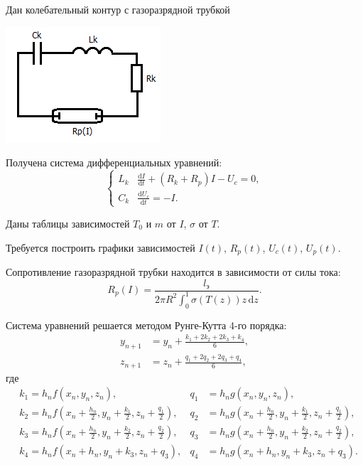 \documentclass[a4paper,oneside,12pt]{extreport}
\begin{document}


Дан колебательный контур с газоразрядной трубкой

\includegraphics{inc/img/scheme}

Получена система дифференциальных уравнений:
\begin{equation*}
	\left\{
	\begin{aligned}
		L_k & \frac{\mathrm dI}{\mathrm dt} + (R_k + R_p) I - U_c = 0, \\
		C_k & \frac{\mathrm dU_c}{\mathrm dt} = -I.
	\end{aligned}
	\right.
\end{equation*}

Даны таблицы зависимостей $T_0$ и $m$ от $I$, $\sigma$ от $T$.

Требуется построить графики зависимостей $I(t)$, $R_p(t)$, $U_c(t)$, $U_p(t)$.

Сопротивление газоразрядной трубки находится в зависимости от силы тока:
\begin{equation*}
	R_p(I) = \frac{l_\text{э}}{2 \pi R^2 \int_0^1 \sigma(T(z))z\,\mathrm dz}.
\end{equation*}

Система уравнений решается методом Рунге-Кутта 4-го порядка:
\begin{equation*}
	\begin{aligned}
		y_{n+1} &= y_n + \frac{k_1 + 2k_2 + 2k_3 + k_4}{6},\\
		z_{n+1} &= z_n + \frac{q_1 + 2q_2 + 2q_3 + q_4}{6},
	\end{aligned}
\end{equation*}
где
\begin{equation*}
	\begin{aligned}
		&k_1  = h_n f(x_n, y_n, z_n),
		&q_1 &= h_n g(x_n, y_n, z_n), \\
		&k_2  = h_n f(x_n + \frac{h_n}{2}, y_n + \frac{k_1}{2}, z_n + \frac{q_1}{2}),
		&q_2 &= h_n g(x_n + \frac{h_n}{2}, y_n + \frac{k_1}{2}, z_n + \frac{q_1}{2}), \\
		&k_3  = h_n f(x_n + \frac{h_n}{2}, y_n + \frac{k_2}{2}, z_n + \frac{q_2}{2}),
		&q_3 &= h_n g(x_n + \frac{h_n}{2}, y_n + \frac{k_2}{2}, z_n + \frac{q_2}{2}), \\
		&k_4  = h_n f(x_n + h_n, y_n + k_3, z_n + q_3),
		&q_4 &= h_n g(x_n + h_n, y_n + k_3, z_n + q_3). \\
	\end{aligned}
\end{equation*}






\end{document}

